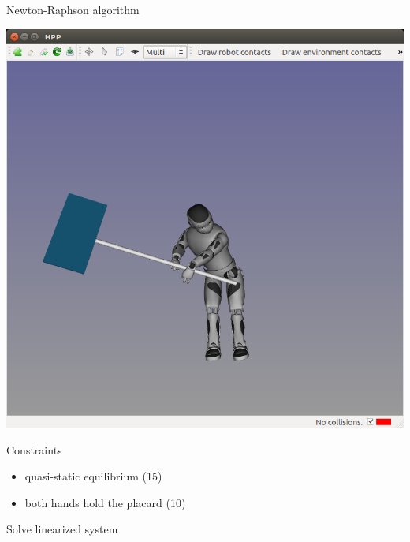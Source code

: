 \begin {frame} {Newton-Raphson algorithm}
  \parbox {.5\linewidth} {
    \centerline {
      \includegraphics [width=\linewidth] {figures/seq/romeo-4.png}
    }
  }
  \hspace*{.05\linewidth}
  \parbox {.39\linewidth} {
    Constraints
    \begin {itemize}
    \item quasi-static equilibrium (15)
    \item both hands hold the placard (10)
    \end{itemize}
  }
  \centerline {
    Solve linearized system
  }
\end {frame}

